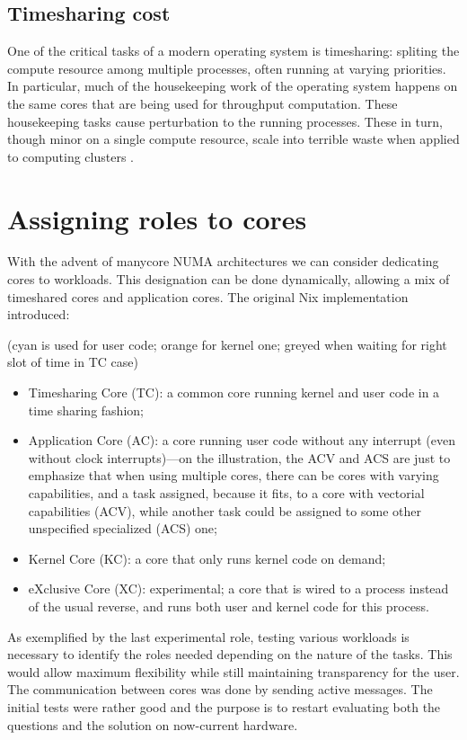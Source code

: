 \documentclass{article}
\begin{document}
\subsection{Timesharing cost}
One of the critical tasks of a modern operating system is timesharing: spliting the compute resource among multiple processes, often running at varying priorities.
In particular, much of the housekeeping work of the operating system happens on the same cores that are being used for throughput computation.
These housekeeping tasks cause perturbation to the running processes.
These in turn, though minor on a single compute resource, scale into terrible waste when applied to computing clusters \cite{Petrini2003}.

\section{Assigning roles to cores}
With the advent of manycore NUMA architectures we can consider dedicating cores to workloads.
This designation can be done dynamically, allowing a mix of timeshared cores and application cores.
The original Nix implementation introduced:
\noindent
{}

\noindent
{\hfil(cyan is used for user code; orange for kernel one; greyed when waiting for right slot of time in TC case)\hfil}
\begin{itemize}
\item Timesharing Core (TC): a common core running kernel and user code in a time sharing fashion;
\item Application Core (AC): a core running user code without any interrupt (even without clock interrupts)---on the illustration, the ACV and ACS are just to emphasize that when using multiple cores, there can be cores with varying capabilities, and a task assigned, because it fits, to a core with vectorial capabilities (ACV), while another task could be assigned to some other unspecified specialized (ACS) one;\item Kernel Core (KC): a core that only runs kernel code on demand;
\item eXclusive Core (XC): experimental; a core that is wired to a process instead of the usual reverse, and runs both user and kernel code for this process.
\end{itemize}

As exemplified by the last experimental role, testing various workloads is necessary to identify the roles needed depending on the nature of the tasks.  This would allow maximum flexibility while still maintaining transparency for the user.
The communication between cores was done by sending active messages.
The initial tests were rather good and the purpose is to restart evaluating both the questions and the solution on now-current hardware.
\end{document}
